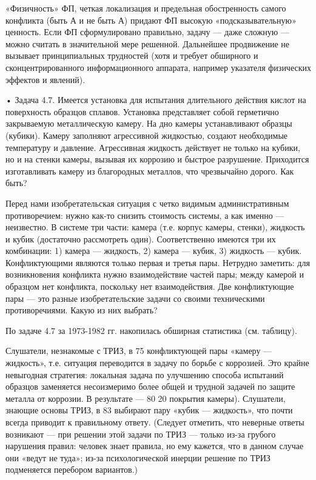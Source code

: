 «Физичность» ФП, четкая локализация  и предельная обостренность самого
конфликта (быть А и не  быть А) придают ФП высокую «подсказывательную»
ценность. Если  ФП сформулировано правильно,  задачу — даже  сложную —
можно  считать в  значительной мере  решенной. Дальнейшее  продвижение
не  вызывает  принципиальных  трудностей  (хотя  и  требует  обширного
и  сконцентрированного  информационного аппарата,  например  указателя
физических эффектов и явлений).

•  Задача 4.7.  Имеется установка  для испытания  длительного действия
кислот  на   поверхность  образцов  сплавов.   Установка  представляет
собой  герметично  закрываемую  металлическую камеру.  На  дно  камеры
устанавливают   образцы   (кубики).   Камеру   заполняют   агрессивной
жидкостью,  создают необходимые  температуру  и давление.  Агрессивная
жидкость действует не только на кубики, но и на стенки камеры, вызывая
их коррозию  и быстрое разрушение. Приходится  изготавливать камеру из
благородных металлов, что чрезвычайно дорого. Как быть?

Перед нами изобретательская ситуация  с четко видимым административным
противоречием: нужно как-то снизить стоимость  системы, а как именно —
неизвестно. В системе три части:  камера (т.е. корпус камеры, стенки),
жидкость и кубик (достаточно рассмотреть один). Соответственно имеются
три  их комбинации:  1)  камера  — жидкость,  2)  камера  — кубик,  3)
жидкость — кубик. Конфликтующими являются только первая и третья пары.
Нетрудно  заметить: для  возникновения конфликта  нужно взаимодействие
частей пары;  между камерой  и образцом  нет конфликта,  поскольку нет
взаимодействия. Две  конфликтующие пары — это  разные изобретательские
задачи со своими техническими противоречиями. Какую из них выбрать?

По задаче  4.7 за  1973-1982 гг.  накопилась обширная  статистика (см.
таблицу).


Слушатели,  незнакомые  с ТРИЗ,  в  75%
конфликтующей пары  «камеру —  жидкость», т.е. ситуация  переводится в
задачу  по  борьбе  с  коррозией.  Это  крайне  невыгодная  стратегия:
локальная задача  по улучшению  способа испытаний  образцов заменяется
несоизмеримо  более  общей и  трудной  задачей  по защите  металла  от
коррозии.  В  результате  —  80%
20%
покрытия  камеры).  Слушатели,  знающие  основы ТРИЗ,  в  83%
выбирают  пару  «кубик  —  жидкость»,  что  почти  всегда  приводит  к
правильному ответу. (Следует отметить, что неверные ответы возникают —
при  решении этой  задачи по  ТРИЗ  — только  из-за грубого  нарушения
правил: человек знает правила, но ему кажется, что в данном случае они
«ведут  не  туда»;  из-за  психологической  инерции  решение  по  ТРИЗ
подменяется перебором вариантов.)

